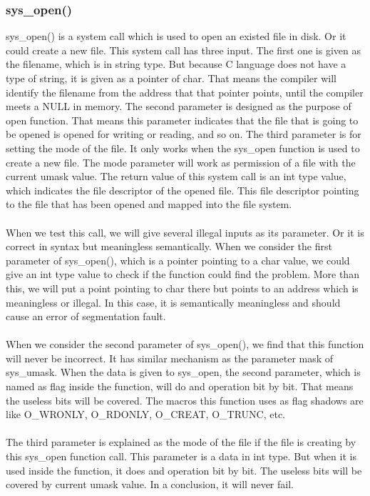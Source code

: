 \documentclass[twoside]{article}
\begin{document}
\begin{multicols}{2}
\subsubsection{sys\_open()}
sys\_open() is a system call which is used to open an existed file in disk. Or it could create a new file. This system call has three input. The first one is given as the filename, which is in string type. But because C language does not have a type of string, it is given as a pointer of char. That means the compiler will identify the filename from the address that that pointer points, until the compiler meets a NULL in memory. The second parameter is designed as the purpose of open function. That means this parameter indicates that the file that is going to be opened is opened for writing or reading, and so on. The third parameter is for setting the mode of the file. It only works when the sys\_open function is used to create a new file. The mode parameter will work as permission of a file with the current umask value. The return value of this system call is an int type value, which indicates the file descriptor of the opened file. This file descriptor pointing to the file that has been opened and mapped into the file system.\\\\
When we test this call, we will give several illegal inputs as its parameter. Or it is correct in syntax but meaningless semantically. When we consider the first parameter of sys\_open(), which is a pointer pointing to a char value, we could give an int type value to check if the function could find the problem. More than this, we will put a point pointing to char there but points to an address which is meaningless or illegal. In this case, it is semantically meaningless and should cause an error of segmentation fault.\\\\
When we consider the second parameter of sys\_open(), we find that this function will never be incorrect. It has similar mechanism as the parameter mask of sys\_umask. When the data is given to sys\_open, the second parameter, which is named as flag inside the function, will do and operation bit by bit. That means the useless bits will be covered. The macros this function uses as flag shadows are like O\_WRONLY, O\_RDONLY, O\_CREAT, O\_TRUNC, etc.\\\\
The third parameter is explained as the mode of the file if the file is creating by this sys\_open function call. This parameter is a data in int type. But when it is used inside the function, it does and operation bit by bit. The useless bits will be covered by current umask value. In a conclusion, it will never fail.\\\\

\end{multicols}
\end{document}
